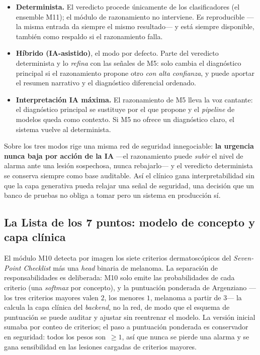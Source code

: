 \begin{itemize}
  \item \textbf{Determinista.} El veredicto procede únicamente de los
  clasificadores (el ensemble M11); el módulo de razonamiento no
  interviene. Es reproducible ---la misma entrada da siempre el mismo
  resultado--- y está siempre disponible, también como respaldo si el
  razonamiento falla.
  \item \textbf{Híbrido (IA-asistido)}, el modo por defecto. Parte del
  veredicto determinista y lo \emph{refina} con las señales de M5: solo
  cambia el diagnóstico principal si el razonamiento propone otro
  \emph{con alta confianza}, y puede aportar el resumen narrativo y el
  diagnóstico diferencial ordenado.
  \item \textbf{Interpretación IA máxima.} El razonamiento de M5 lleva la
  voz cantante: el diagnóstico principal se sustituye por el que propone y
  el \emph{pipeline} de modelos queda como contexto. Si M5 no ofrece un
  diagnóstico claro, el sistema vuelve al determinista.
\end{itemize}

Sobre los tres modos rige una misma red de seguridad innegociable:
\textbf{la urgencia nunca baja por acción de la IA} ---el razonamiento
puede \emph{subir} el nivel de alarma ante una lesión sospechosa, nunca
rebajarlo--- y el veredicto determinista se conserva siempre como base
auditable. Así el clínico gana interpretabilidad sin que la capa
generativa pueda relajar una señal de seguridad, una decisión que un banco
de pruebas no obliga a tomar pero un sistema en producción sí.


\subsection{La Lista de los 7 puntos: modelo de concepto y capa clínica}
\label{sec:proto-7pc}

El módulo M10 detecta por imagen los siete criterios dermatoscópicos del
\emph{Seven-Point Checklist} más una \emph{head} binaria de melanoma. La
separación de responsabilidades es deliberada: M10 solo emite las
probabilidades de cada criterio (una \emph{softmax} por concepto), y la
puntuación ponderada de Argenziano ---los tres criterios mayores valen
$2$, los menores $1$, melanoma a partir de $3$--- la calcula la capa
clínica del \emph{backend}, no la red, de modo que el esquema de puntuación
se puede auditar y ajustar sin reentrenar el modelo. La versión inicial
sumaba por conteo de criterios; el paso a puntuación ponderada es
conservador en seguridad: todos los pesos son~$\geq 1$, así que nunca se
pierde una alarma y se gana sensibilidad en las lesiones cargadas de
criterios mayores.

